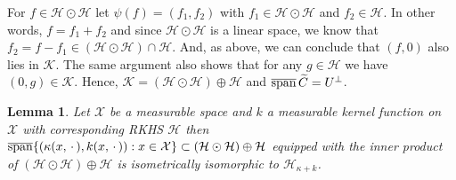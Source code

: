\documentclass[10pt]{amsart}
\newtheorem{lemm}[theo]{Lemma}\newtheorem{prop}[theo]{Proposition}\newtheorem{coro}[theo]{Corollary}\newtheorem{conj}[theo]{Conjecture}
\theoremstyle{definition}\newtheorem{defi}[theo]{Definition}\newtheorem{rema}[theo]{Remark}\newtheorem{exam}[theo]{Example}\newtheorem{exem}[theo]{Example}\newtheorem{nota}[theo]{Notation}
\theoremstyle{remark}
\DeclareMathOperator{\cspn}{\overline{span}}
\newcommand{\X}{\mathcal{X}}
\newcommand{\cH}{\mathcal{H}}
\newcommand{\clK}{\mathcal{K}}
\let\oldtilde\tilde
\renewcommand*{\tilde}[1]{\mathchoice{\widetilde{#1}}{\widetilde{#1}}{\oldtilde{#1}}{\oldtilde{#1}}}
\begin{document}
For $f\in \cH \odot \cH$ let $\psi(f) = (f_1,f_2)$ with $f_1 \in \cH\odot \cH$ and $f_2 \in \cH$. In other words, $f = f_1 + f_2$ and since $\cH \odot \cH$ is a linear space, we know that $f_2 = f - f_1 \in (\cH \odot \cH) \cap \cH$. And, as above, we can conclude that $(f, 0)$ also lies in $\clK$. The same argument also shows that for any $g \in \cH$ we have $(0,g) \in \clK$. Hence, $\clK = (\cH \odot \cH) \oplus \cH$ and $\cspn \tilde C = U^\perp$.



\begin{lemm}\label{lem:iso_iso_quotient}
Let $\X$ be a measurable space and $k$ a measurable kernel function on $\X$ with corresponding RKHS $\cH$ then $\cspn\{(\kappa(x,\,\cdot\,), k(x,\,\cdot\,)) : x \in \X \} \subset\linebreak (\cH \odot \cH) \oplus \cH$ equipped with the inner product of $(\cH \odot \cH) \oplus \cH$ is isometrically isomorphic to $\cH_{\kappa + k}$.
\end{lemm}
\end{document}
